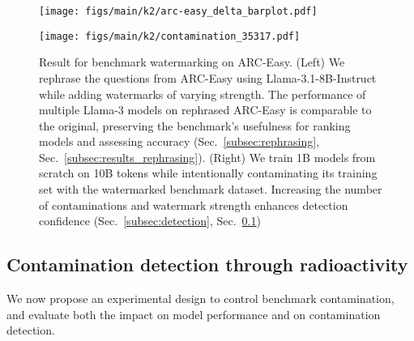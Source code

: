 \begin{figure}[b!] %
    \centering
    \begin{minipage}{0.49\textwidth}
        \centering
        \texttt{[image: figs/main/k2/arc-easy\_delta\_barplot.pdf]}
        \label{fig:results_overview_arc_easy_perfs}
    \end{minipage}\hfill
    \begin{minipage}{0.49\textwidth}
        \centering
        \texttt{[image: figs/main/k2/contamination\_35317.pdf]}
        \label{fig:results_overview_arc_easy_detection}
    \end{minipage}
    \caption{
    Result for benchmark watermarking on ARC-Easy. %
    (Left) We rephrase the questions from ARC-Easy using Llama-3.1-8B-Instruct while adding watermarks of varying strength. 
    The performance of multiple Llama-3 models on rephrased ARC-Easy is comparable to the original, preserving the benchmark's usefulness for ranking models and assessing accuracy (Sec.~\ref{subsec:rephrasing}, Sec.~\ref{subsec:results_rephrasing}). (Right) We train 1B models from scratch on 10B tokens while intentionally contaminating its training set with the watermarked benchmark dataset. 
    Increasing the number of contaminations and watermark strength enhances detection confidence (Sec.~\ref{subsec:detection}, Sec.~\ref{subsec:result_detection})}
    \vspace{-0.3cm}\label{fig:results_overview_arc_easy}
\end{figure}

\subsection{Contamination detection through radioactivity}\label{subsec:result_detection}

We now propose an experimental design to control benchmark contamination, and evaluate both the impact on model performance and on contamination detection.

